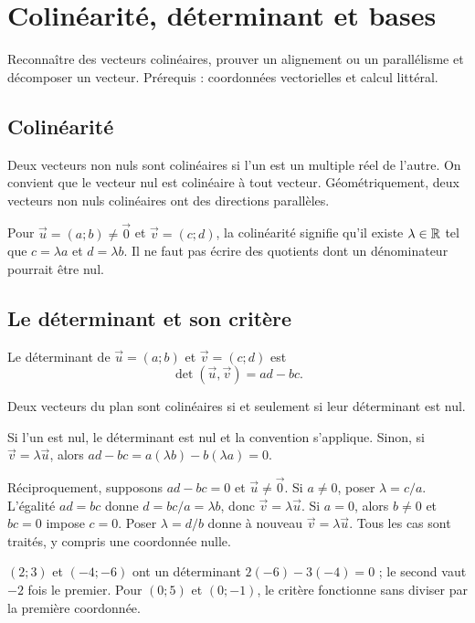 \documentclass[../cours_2de.tex]{subfiles}
\begin{document}
\setcounter{chapter}{8}
\chapter{Colinéarité, déterminant et bases}
\label{sec:ch09}
\begin{objectif}
Reconnaître des vecteurs colinéaires, prouver un alignement ou un parallélisme et décomposer un vecteur. Prérequis : coordonnées vectorielles et calcul littéral.
\end{objectif}
\section{Colinéarité}
Deux vecteurs non nuls sont colinéaires si l'un est un multiple réel de l'autre. On convient que le vecteur nul est colinéaire à tout vecteur. Géométriquement, deux vecteurs non nuls colinéaires ont des directions parallèles.

Pour $\vec u=(a;b)\ne\vec0$ et $\vec v=(c;d)$, la colinéarité signifie qu'il existe $\lambda\in\mathbb{R}$ tel que $c=\lambda a$ et $d=\lambda b$. Il ne faut pas écrire des quotients dont un dénominateur pourrait être nul.
\section{Le déterminant et son critère}
\begin{definition}
Le déterminant de $\vec u=(a;b)$ et $\vec v=(c;d)$ est
\[
\det(\vec u,\vec v)=ad-bc.
\]
\end{definition}
\begin{theoreme}
Deux vecteurs du plan sont colinéaires si et seulement si leur déterminant est nul.
\end{theoreme}
\begin{demonstration}
Si l'un est nul, le déterminant est nul et la convention s'applique. Sinon, si $\vec v=\lambda\vec u$, alors $ad-bc=a(\lambda b)-b(\lambda a)=0$.

Réciproquement, supposons $ad-bc=0$ et $\vec u\ne\vec0$. Si $a\ne0$, poser $\lambda=c/a$. L'égalité $ad=bc$ donne $d=bc/a=\lambda b$, donc $\vec v=\lambda\vec u$. Si $a=0$, alors $b\ne0$ et $bc=0$ impose $c=0$. Poser $\lambda=d/b$ donne à nouveau $\vec v=\lambda\vec u$. Tous les cas sont traités, y compris une coordonnée nulle.
\end{demonstration}
\begin{exemple}
$(2;3)$ et $(-4;-6)$ ont un déterminant $2(-6)-3(-4)=0$ ; le second vaut $-2$ fois le premier. Pour $(0;5)$ et $(0;-1)$, le critère fonctionne sans diviser par la première coordonnée.
\end{exemple}
\end{document}
